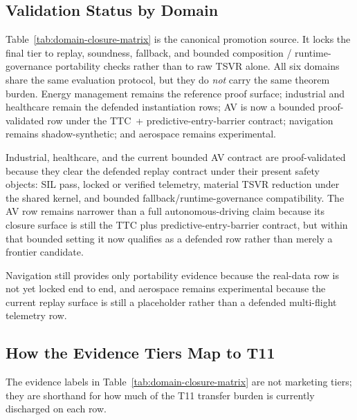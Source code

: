 \subsection{Validation Status by Domain}


Table~\ref{tab:domain-closure-matrix} is the canonical promotion source.  It
locks the final tier to replay, soundness, fallback, and bounded composition /
runtime-governance portability checks rather than to raw TSVR alone.  All six domains
share the same evaluation protocol, but they do \emph{not} carry the same
theorem burden.  Energy management remains the reference proof surface;
industrial and healthcare remain the defended instantiation rows; AV is now a
bounded proof-validated row under the TTC~+ predictive-entry-barrier contract; navigation
remains shadow-synthetic; and aerospace remains experimental.

Industrial, healthcare, and the current bounded AV contract are proof-validated
because they clear the defended replay contract under their present safety
objects: SIL pass, locked or verified telemetry, material TSVR reduction under
the shared kernel, and bounded fallback/runtime-governance compatibility.  The
AV row remains narrower than a full autonomous-driving claim because its closure
surface is still the TTC plus predictive-entry-barrier contract, but within
that bounded setting it now qualifies as a defended row rather than merely a
frontier candidate.

Navigation still provides only portability evidence because the real-data row
is not yet locked end to end, and aerospace remains experimental because the
current replay surface is still a placeholder rather than a defended
multi-flight telemetry row.

\subsection{How the Evidence Tiers Map to T11}

The evidence labels in Table~\ref{tab:domain-closure-matrix} are not
marketing tiers; they are shorthand for how much of the T11 transfer burden
is currently discharged on each row.

